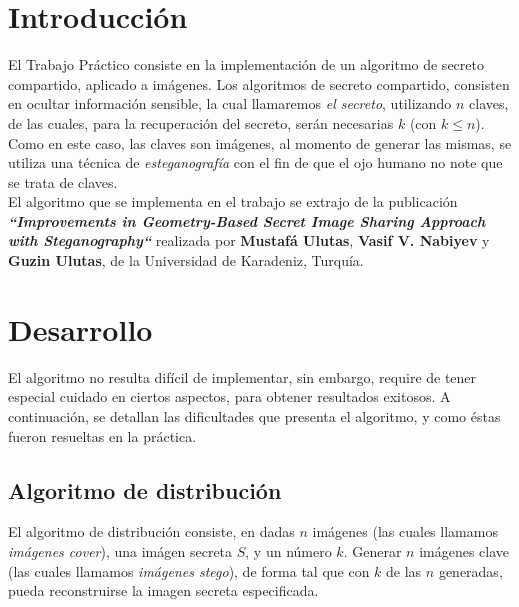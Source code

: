 \documentclass{article}
\begin{document}
\section{Introducción}

El Trabajo Práctico consiste en la implementación de un algoritmo de secreto compartido, aplicado a imágenes. Los algoritmos
de secreto compartido, consisten en ocultar información sensible, la cual llamaremos \emph{el secreto}, utilizando $n$ claves, de las cuales, para la
recuperación del secreto, serán necesarias $k$ (con $k \le n$).\\

Como en este caso, las claves son imágenes, al momento de generar las mismas, se utiliza una técnica de \emph{esteganografía} con el fin
de que el ojo humano no note que se trata de claves.\\

El algoritmo que se implementa en el trabajo se extrajo de la publicación \textbf{\emph{``Improvements in Geometry-Based Secret Image Sharing Approach
with Steganography``}} realizada por \textbf{Mustafá Ulutas}, \textbf{Vasif V. Nabiyev} y \textbf{Guzin Ulutas}, de la Universidad de Karadeniz, Turquía.

\section{Desarrollo}

El algoritmo no resulta difícil de implementar, sin embargo, require de tener especial cuidado en ciertos aspectos, para obtener resultados 
exitosos. A continuación, se detallan las dificultades que presenta el algoritmo, y como éstas fueron resueltas en la práctica.

\subsection{Algoritmo de distribución}

El algoritmo de distribución consiste, en dadas $n$ imágenes (las cuales llamamos \emph{imágenes cover}), una imágen secreta $S$, y un número $k$. 
Generar $n$ imágenes clave (las cuales llamamos \emph{imágenes stego}), de forma tal que con $k$ de las $n$ generadas, pueda reconstruirse la imagen secreta especificada.\\
\end{document}

